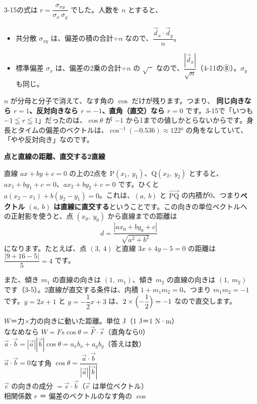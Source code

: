 3-15の式は $r=\dfrac{\sigma_{xy}}{\sigma_x\,\sigma_y}$ でした。人数を $n$ とすると、
\begin{itemize}[leftmargin=1.2\zw, itemsep=2pt, topsep=1pt, label={\color{\bkTT}●}]
\item 共分散 $\sigma_{xy}$ は、偏差の積の合計÷$n$ なので、$\dfrac{\vec{d}_x\cdot\vec{d}_y}{n}$。
\item 標準偏差 $\sigma_x$ は、偏差の2乗の合計÷$n$ の $\sqrt{\phantom{x}}$ なので、$\dfrac{|\vec{d}_x|}{\sqrt{n}}$（4-11の⑧）。$\sigma_y$ も同じ。
\end{itemize}
$n$ が分母と分子で消えて、なす角の $\cos$ だけが残ります。つまり、
\textbf{同じ向きなら $r=1$、反対向きなら $r=-1$、直角（直交）なら $r=0$} です。3-15で「いつも $-1\leqq r\leqq1$」だったのは、$\cos\theta$ が $-1$ から1までの値しかとらないからです。身長とタイムの偏差のベクトルは、$\cos^{-1}(-0.536)\approx122°$ の角をなしていて、「やや反対向き」なのです。

\begin{motto}[4]
\textbf{点と直線の距離、直交する2直線}\par
直線 $ax+by+c=0$ の上の2点を $\mathrm{P}(x_1,\ y_1)$、$\mathrm{Q}(x_2,\ y_2)$ とすると、$ax_1+by_1+c=0$、$ax_2+by_2+c=0$ です。ひくと $a(x_2-x_1)+b(y_2-y_1)=0$。これは、$(a,\ b)$ と $\overrightarrow{\mathrm{PQ}}$ の内積が0、つまり\textbf{ベクトル $(a,\ b)$ は直線に直交する}ということです。この向きの単位ベクトルへの正射影を使うと、点 $(x_0,\ y_0)$ から直線までの距離は
\[ d=\frac{|ax_0+by_0+c|}{\sqrt{a^2+b^2}} \]
になります。たとえば、点 $(3,\ 4)$ と直線 $3x+4y-5=0$ の距離は $\dfrac{|9+16-5|}{5}=4$ です。\par\vspace{3pt}
また、傾き $m_1$ の直線の向きは $(1,\ m_1)$、傾き $m_2$ の直線の向きは $(1,\ m_2)$ です（3-5）。2直線が直交する条件は、内積 $1+m_1m_2=0$、つまり $m_1m_2=-1$ です。$y=2x+1$ と $y=-\dfrac{1}{2}x+3$ は、$2\times\Bigl(-\dfrac{1}{2}\Bigr)=-1$ なので直交します。
\end{motto}

\begin{taisetsu}
\def\tsl#1{\makebox[4.2\zw][l]{\sffamily\bfseries\small\color{bkDeep}#1}}
\tsl{仕事}$W$＝力×力の向きに動いた距離。単位 J（1 J＝1 N·m）\\[3pt]
\tsl{}ななめなら $W=Fs\cos\theta=\vec{F}\cdot\vec{s}$（直角なら0）\\[3pt]
\tsl{内積}$\vec{a}\cdot\vec{b}=|\vec{a}||\vec{b}|\cos\theta=a_xb_x+a_yb_y$（答えは数）\\[3pt]
\tsl{直交}$\vec{a}\cdot\vec{b}=0$\qquad なす角 $\cos\theta=\dfrac{\vec{a}\cdot\vec{b}}{|\vec{a}||\vec{b}|}$\\[3pt]
\tsl{正射影}$\vec{e}$ の向きの成分 $=\vec{e}\cdot\vec{b}$（$\vec{e}$ は単位ベクトル）\\[3pt]
\tsl{相関}相関係数 $r$ ＝ 偏差のベクトルのなす角の $\cos$
\end{taisetsu}

